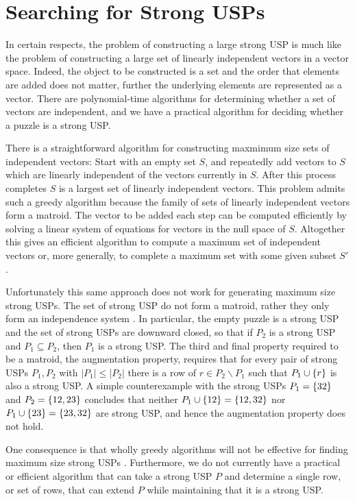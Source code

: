 \documentclass[11pt]{article}
\begin{document}
\section{Searching for Strong USPs}
\label{sec:search}

In certain respects, the problem of constructing a large strong USP is
much like the problem of constructing a large set of linearly
independent vectors in a vector space.  Indeed, the object to be
constructed is a set and the order that elements are added does not
matter, further the underlying elements are represented as a vector.
There are polynomial-time algorithms for determining whether a set of
vectors are independent, and we have a practical algorithm for
deciding whether a puzzle is a strong USP.

There is a straightforward algorithm for constructing maxmimum size
sets of independent vectors: Start with an empty set $S$, and
repeatedly add vectors to $S$ which are linearly independent of the
vectors currently in $S$.  After this process completes $S$ is a
largest set of linearly independent vectors.  This problem admits such
a greedy algorithm because the family of sets of linearly independent vectors
form a matroid.  The vector to be added each step can be computed
efficiently by solving a linear system of equations for vectors in the
null space of $S$.  Altogether this gives an efficient algorithm to
compute a maximum set of independent vectors or, more generally, to
complete a maximum set with some given subset $S'$.

Unfortunately this same approach does not work for generating maximum
size strong USPs.  The set of strong USP do not form a matroid, rather
they only form an independence system \cite{XXX}.  In particular, the
empty puzzle is a strong USP and the set of strong USPs are downward
closed, so that if $P_2$ is a strong USP and $P_1 \subseteq P_2$, then
$P_1$ is a strong USP.  The third and final property required to be a
matroid, the augmentation property, requires that for every pair of
strong USPs $P_1, P_2$ with $|P_1| \le |P_2|$ there is a row of $r \in
P_2 \backslash P_1$ such that $P_1 \cup \left\{ r \right\}$ is also a strong USP.
A simple counterexample with the strong USPs $P_1 = \left\{ 32 \right\}$ and $P_2
= \left\{ 12, 23 \right\}$ concludes that neither $P_1 \cup \left\{ 12 \right\} = \left\{ 12,
  32 \right\}$ nor $P_1 \cup \left\{ 23 \right\} = \left\{ 23, 32 \right\}$ are strong USP, and
hence the augmentation property does not hold.

One consequence is that wholly greedy algorithms will not be effective
for finding maximum size strong USPs \cite{XXX}.  Furthermore, we do not
currently have a practical or efficient algorithm that can take a
strong USP $P$ and determine a single row, or set of rows, that can
extend $P$ while maintaining that it is a strong USP.
\end{document}

